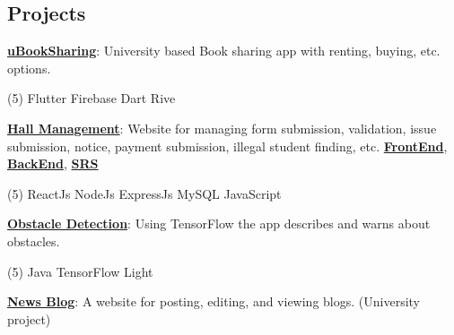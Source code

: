 \documentclass[mm]{simple_style}
\let\oldhref\href
\renewcommand{\href}[2]{\oldhref{#1}{\bfseries#2}}
\begin{document}
\begin{resume}
\section{Projects}
{\href{https://github.com/Sourav9063/uBookSharing}{uBookSharing}}: University based Book sharing app with renting, buying, etc. options.\\
\vspace{-4mm}
\begin{tasks}[style=itemize ,label=\textcolor{gray}{$\bullet$}](5)
\task Flutter
\task Firebase
\task Dart
\task Rive
\end{tasks}
\vspace{-3mm}
\href{https://sourav9063.github.io/hall_management_rf/}{Hall Management}: Website for managing form submission, validation, issue submission, notice, payment submission, illegal student finding, etc. \href{https://github.com/Sourav9063/hall_management_rf}{FrontEnd}, \href{https://github.com/Sourav9063/Backend_hall_management}{BackEnd},
\href{https://docs.google.com/document/d/1Sy9VO97rWJrOYCMgWRGJz4H2q3vJPSVCpLRm5AUOsO8/edit?usp=sharing}{SRS}\\
\vspace{-4mm}
\begin{tasks}[style=itemize ,label=\textcolor{gray}{$\bullet$}](5)
\task ReactJs 
\task NodeJs
\task ExpressJs
\task MySQL 
\task JavaScript
\end{tasks}
\vspace{-3mm}
\href{https://github.com/Sourav9063/obstacles_detection}{Obstacle Detection}: Using TensorFlow the app describes and warns about obstacles.\\
\vspace{-4mm}
\begin{tasks}[style=itemize ,label=\textcolor{gray}{$\bullet$}](5)
\task Java
\task TensorFlow Light
\end{tasks}
\vspace{-3mm}
\href{https://github.com/Sourav9063/Blog-CRUD-by-Nodejs}{News Blog}: A website for posting, editing, and viewing blogs. (University project)\\

\end{resume}
\end{document}
